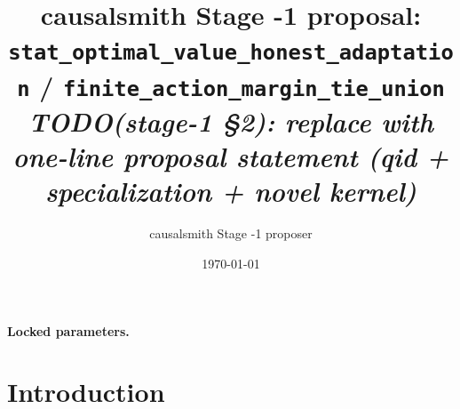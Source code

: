 \documentclass[11pt]{article}
\title{causalsmith Stage -1 proposal: \texttt{stat\_optimal\_value\_honest\_adaptation} / \texttt{finite\_action\_margin\_tie\_union}%
  \\ \large\textit{TODO(stage-1 \S2): replace with one-line proposal statement (qid + specialization + novel kernel)}}
\author{causalsmith Stage -1 proposer}
\date{\today}
\theoremstyle{definition}
\theoremstyle{plain}
\theoremstyle{remark}
\begin{document}
\maketitle


\paragraph{Locked parameters.}

\begin{abstract}
\end{abstract}

\section{Introduction}
%
%
%
%
\end{document}
